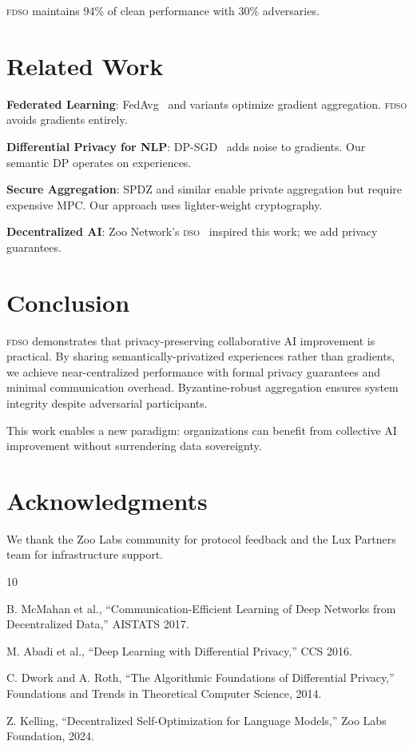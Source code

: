 \documentclass[11pt,letterpaper]{article}
\newcommand{\DSO}{\textsc{dso}}
\newcommand{\FDSO}{\textsc{fdso}}
\begin{document}
\FDSO{} maintains 94\% of clean performance with 30\% adversaries.

\section{Related Work}

\textbf{Federated Learning}: FedAvg~\cite{mcmahan2017fedavg} and variants optimize gradient aggregation. \FDSO{} avoids gradients entirely.

\textbf{Differential Privacy for NLP}: DP-SGD~\cite{abadi2016dpsgd} adds noise to gradients. Our semantic DP operates on experiences.

\textbf{Secure Aggregation}: SPDZ and similar enable private aggregation but require expensive MPC. Our approach uses lighter-weight cryptography.

\textbf{Decentralized AI}: Zoo Network's \DSO{}~\cite{zoo2024dso} inspired this work; we add privacy guarantees.

\section{Conclusion}

\FDSO{} demonstrates that privacy-preserving collaborative AI improvement is practical. By sharing semantically-privatized experiences rather than gradients, we achieve near-centralized performance with formal privacy guarantees and minimal communication overhead. Byzantine-robust aggregation ensures system integrity despite adversarial participants.

This work enables a new paradigm: organizations can benefit from collective AI improvement without surrendering data sovereignty.

\section*{Acknowledgments}

We thank the Zoo Labs community for protocol feedback and the Lux Partners team for infrastructure support.


\begin{thebibliography}{10}

B. McMahan et al., ``Communication-Efficient Learning of Deep Networks from Decentralized Data,'' AISTATS 2017.

M. Abadi et al., ``Deep Learning with Differential Privacy,'' CCS 2016.

C. Dwork and A. Roth, ``The Algorithmic Foundations of Differential Privacy,'' Foundations and Trends in Theoretical Computer Science, 2014.

Z. Kelling, ``Decentralized Self-Optimization for Language Models,'' Zoo Labs Foundation, 2024.

\end{thebibliography}
\end{document}
